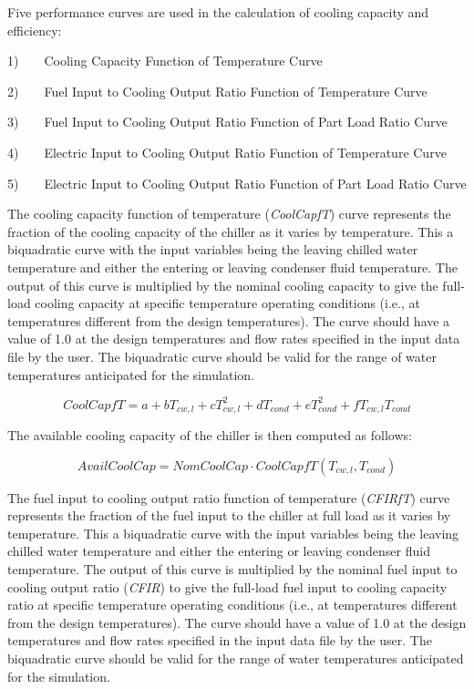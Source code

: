Five performance curves are used in the calculation of cooling capacity and efficiency:

1)~~~~Cooling Capacity Function of Temperature Curve

2)~~~~Fuel Input to Cooling Output Ratio Function of Temperature Curve

3)~~~~Fuel Input to Cooling Output Ratio Function of Part Load Ratio Curve

4)~~~~Electric Input to Cooling Output Ratio Function of Temperature Curve

5)~~~~Electric Input to Cooling Output Ratio Function of Part Load Ratio Curve

The cooling capacity function of temperature (\emph{CoolCapfT}) curve represents the fraction of the cooling capacity of the chiller as it varies by temperature. This a biquadratic curve with the input variables being the leaving chilled water temperature and either the entering or leaving condenser fluid temperature. The output of this curve is multiplied by the nominal cooling capacity to give the full-load cooling capacity at specific temperature operating conditions (i.e., at temperatures different from the design temperatures). The curve should have a value of 1.0 at the design temperatures and flow rates specified in the input data file by the user. The biquadratic curve should be valid for the range of water temperatures anticipated for the simulation.

\begin{equation}
CoolCapfT = a + b{T_{cw,l}} + cT_{cw,l}^2 + d{T_{cond}} + eT_{cond}^2 + f{T_{cw,l}}{T_{cond}}
\end{equation}

The available cooling capacity of the chiller is then computed as follows:

\begin{equation}
AvailCoolCap = NomCoolCap \cdot CoolCapfT({T_{cw,l}},{T_{cond}})
\end{equation}

The fuel input to cooling output ratio function of temperature (\emph{CFIRfT}) curve represents the fraction of the fuel input to the chiller at full load as it varies by temperature. This a biquadratic curve with the input variables being the leaving chilled water temperature and either the entering or leaving condenser fluid temperature. The output of this curve is multiplied by the nominal fuel input to cooling output ratio (\emph{CFIR}) to give the full-load fuel input to cooling capacity ratio at specific temperature operating conditions (i.e., at temperatures different from the design temperatures). The curve should have a value of 1.0 at the design temperatures and flow rates specified in the input data file by the user. The biquadratic curve should be valid for the range of water temperatures anticipated for the simulation.

